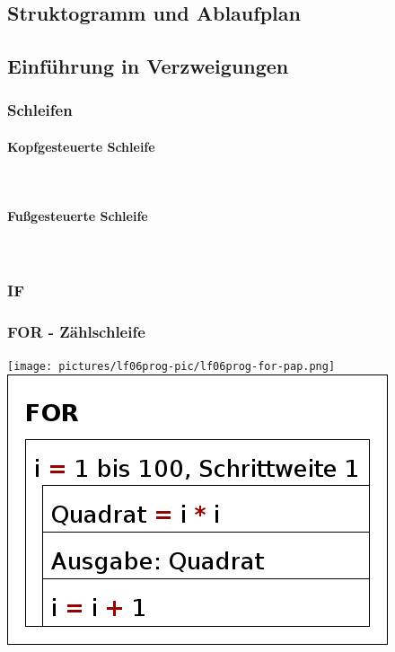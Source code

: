 
\subsection{Struktogramm und Ablaufplan}



\subsection{Einführung in Verzweigungen}

\subsubsection{Schleifen}

\paragraph{Kopfgesteuerte Schleife}~\\

\paragraph{Fußgesteuerte Schleife}~\\

\subsubsection{IF}

\subsubsection{FOR - Zählschleife}

\texttt{[image: pictures/lf06prog-pic/lf06prog-for-pap.png]}
\includegraphics[scale=0.4]{pictures/lf06prog-pic/lf06prog-for-struct.png}

